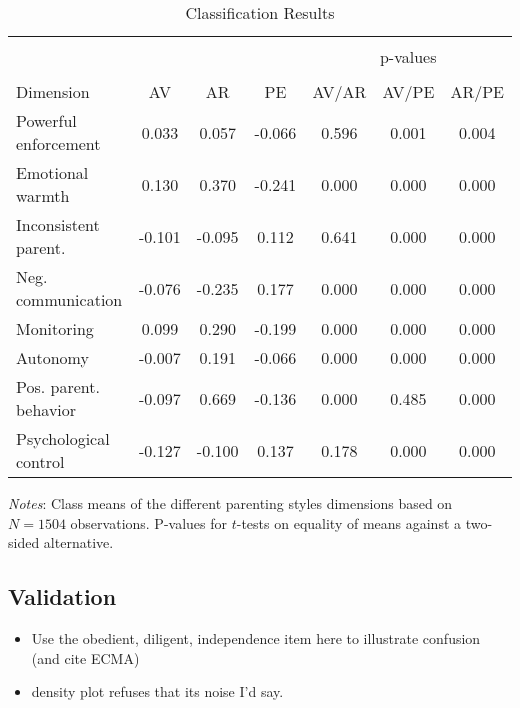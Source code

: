 \begin{table}[!htbp]
	\centering
	\begin{threeparttable}
		\caption{Classification Results}
		\label{tab:class}
		\begin{tabular}{lcccccc}
			\hline \hline\\[-1.8ex] 
			&    &    &    &\multicolumn{3}{c}{p-values} \\ 
			\cline{5-7} \\[-1.8ex]Dimension & AV & AR & PE & AV/AR & AV/PE & AR/PE \\ 
			\midrule
			Powerful enforcement & 0.033 & 0.057 & -0.066 & 0.596 & 0.001 & 0.004 \\ 
			Emotional warmth & 0.130 & 0.370 & -0.241 & 0.000 & 0.000 & 0.000 \\ 
			Inconsistent parent. & -0.101 & -0.095 & 0.112 & 0.641 & 0.000 & 0.000 \\ 
			Neg. communication & -0.076 & -0.235 & 0.177 & 0.000 & 0.000 & 0.000 \\ 
			Monitoring & 0.099 & 0.290 & -0.199 & 0.000 & 0.000 & 0.000 \\ 
			Autonomy & -0.007 & 0.191 & -0.066 & 0.000 & 0.000 & 0.000 \\ 
			Pos. parent. behavior & -0.097 & 0.669 & -0.136 & 0.000 & 0.485 & 0.000 \\ 
			Psychological control & -0.127 & -0.100 & 0.137 & 0.178 & 0.000 & 0.000 \\ 
			\hline \bottomrule
		\end{tabular}
		\begin{tablenotes}
			\small
			\item \textit{Notes}: Class means of the different parenting styles dimensions based on $N = 1504$ observations. P-values for $t$-tests on equality of means against a two-sided alternative.
		\end{tablenotes}
	\end{threeparttable}
\end{table}

\subsection{Validation}
\begin{itemize}
	\item Use the obedient, diligent, independence item here to illustrate confusion (and cite ECMA)
	\item density plot refuses that its noise I'd say.
\end{itemize}